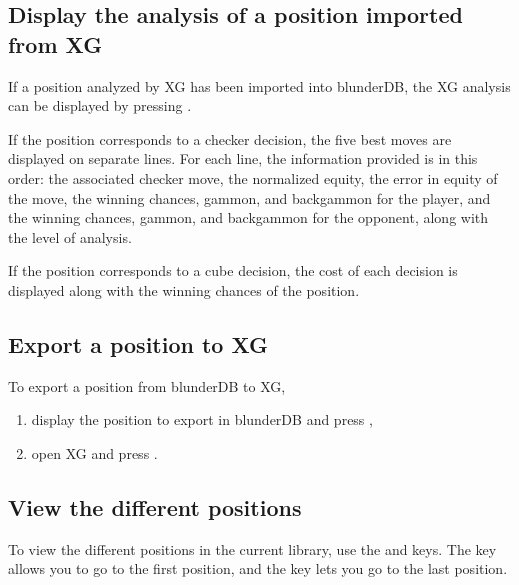 \documentclass[letterpaper,10pt,english]{sphinxmanual}
\begin{document}
\subsection{Display the analysis of a position imported from XG}
\label{\detokenize{guide_utilisateur:afficher-l-analyse-d-une-position-importee-depuis-xg}}
\sphinxAtStartPar
If a position analyzed by XG has been imported into blunderDB, the XG analysis can be displayed by pressing .

\sphinxAtStartPar
If the position corresponds to a checker decision, the five best moves are displayed on separate lines. For each line, the information provided is in this order: the associated checker move, the normalized equity, the error in equity of the move, the winning chances, gammon, and backgammon for the player, and the winning chances, gammon, and backgammon for the opponent, along with the level of analysis.

\sphinxAtStartPar
If the position corresponds to a cube decision, the cost of each decision is displayed along with the winning chances of the position.


\subsection{Export a position to XG}
\label{\detokenize{guide_utilisateur:exporter-une-position-vers-xg}}
\sphinxAtStartPar
To export a position from blunderDB to XG,
\begin{enumerate}
%
\item {} 
\sphinxAtStartPar
display the position to export in blunderDB and press ,

\item {} 
\sphinxAtStartPar
open XG and press .

\end{enumerate}


\subsection{View the different positions}
\label{\detokenize{guide_utilisateur:visualiser-les-differentes-positions}}
\sphinxAtStartPar
To view the different positions in the current library, use the  and  keys. The  key allows you to go to the first position, and the  key lets you go to the last position.
\end{document}
